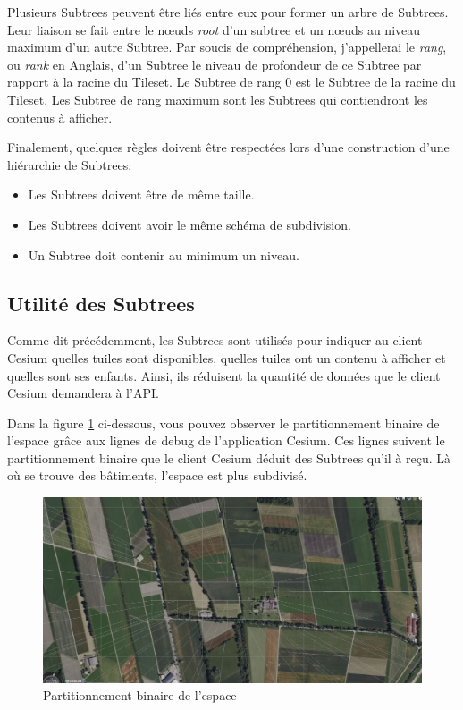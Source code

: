 Plusieurs Subtrees peuvent être liés entre eux pour former un arbre de Subtrees. Leur liaison se fait entre le nœuds \textit{root} d'un subtree et un nœuds au niveau maximum d'un autre Subtree. Par soucis de compréhension, j'appellerai le \textit{rang}, ou \textit{rank} en Anglais, d'un Subtree le niveau de profondeur de ce Subtree par rapport à la racine du Tileset. Le Subtree de rang 0 est le Subtree de la racine du Tileset. Les Subtree de rang maximum sont les Subtrees qui contiendront les contenus à afficher.

Finalement, quelques règles doivent être respectées lors d'une construction d'une hiérarchie de Subtrees:

\begin{itemize}
    \item Les Subtrees doivent être de même taille.
    \item Les Subtrees doivent avoir le même schéma de subdivision.
    \item Un Subtree doit contenir au minimum un niveau.
\end{itemize}

\newpage
\subsection*{Utilité des Subtrees}

Comme dit précédemment, les Subtrees sont utilisés pour indiquer au client Cesium quelles tuiles sont disponibles, quelles tuiles ont un contenu à afficher et quelles sont ses enfants. Ainsi, ils réduisent la quantité de données que le client Cesium demandera à l'API.

Dans la figure \ref{fig:subtree-debug} ci-dessous, vous pouvez observer le partitionnement binaire de l'espace grâce aux lignes de debug de l'application Cesium. Ces lignes suivent le partitionnement binaire que le client Cesium déduit des Subtrees qu'il à reçu. Là où se trouve des bâtiments, l'espace est plus subdivisé.

\begin{figure}[H]
    \centering
    \includegraphics[width=1\textwidth]{assets/figures/Subtree_debug.png}
    \caption{Partitionnement binaire de l'espace}
    \label{fig:subtree-debug}
\end{figure}


